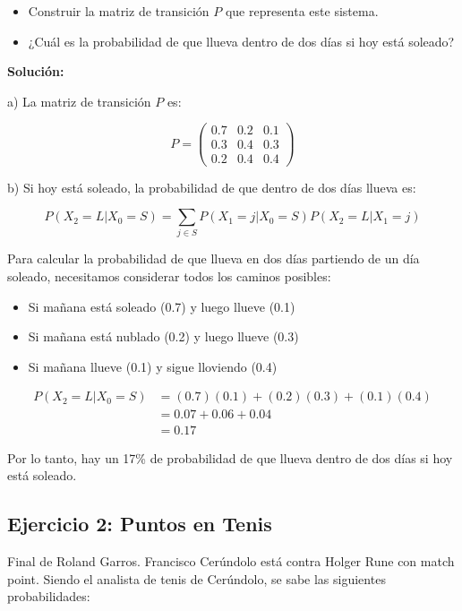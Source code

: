 \documentclass[a4paper,11pt]{article}
\begin{document}
\begin{itemize}
    \item[a)] Construir la matriz de transición $P$ que representa este sistema.
    \item[b)] ¿Cuál es la probabilidad de que llueva dentro de dos días si hoy está soleado?
\end{itemize}

\textbf{Solución:}

\vspace{0.5em}

a) La matriz de transición $P$ es:

\[P = \begin{pmatrix}
0.7 & 0.2 & 0.1 \\
0.3 & 0.4 & 0.3 \\
0.2 & 0.4 & 0.4
\end{pmatrix}\]

b) Si hoy está soleado, la probabilidad de que dentro de dos días llueva es:

\[P(X_2 = L | X_0 = S) = \sum_{j \in S} P(X_1 = j | X_0 = S)P(X_2 = L | X_1 = j)\]

Para calcular la probabilidad de que llueva en dos días partiendo de un día soleado, necesitamos considerar todos los caminos posibles:

\begin{itemize}
    \item Si mañana está soleado (0.7) y luego llueve (0.1)
    \item Si mañana está nublado (0.2) y luego llueve (0.3)
    \item Si mañana llueve (0.1) y sigue lloviendo (0.4)
\end{itemize}

\[
\begin{aligned}
P(X_2 = L | X_0 = S) &= (0.7)(0.1) + (0.2)(0.3) + (0.1)(0.4) \\
&= 0.07 + 0.06 + 0.04 \\
&= 0.17
\end{aligned}
\]

Por lo tanto, hay un 17\% de probabilidad de que llueva dentro de dos días si hoy está soleado.

\subsection{Ejercicio 2: Puntos en Tenis}

Final de Roland Garros. Francisco Cerúndolo está contra Holger Rune con match point. Siendo el analista de tenis de Cerúndolo, se sabe las siguientes probabilidades:
\end{document}
